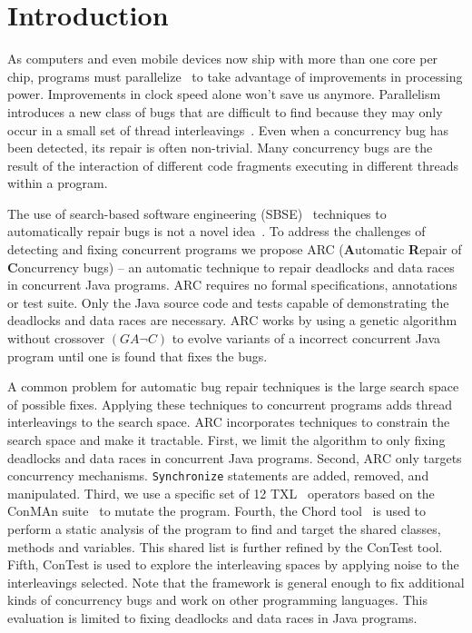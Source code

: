 \documentclass[runningheads,a4paper]{llncs}
\begin{document}
 \section{Introduction}
\label{sec:introduction}

As computers and even mobile devices now ship with more than one core per chip, programs must parallelize~\cite{SL05} to take advantage of improvements in processing power. Improvements in clock speed alone won't save us anymore. Parallelism introduces a new class of bugs that are difficult to find because they may only occur in a small set of thread interleavings~\cite{MQB07}. Even when a concurrency bug has been detected, its repair is often non-trivial. Many concurrency bugs are the result of the interaction of different code fragments executing in different threads within a program. 

The use of search-based software engineering (SBSE)~\cite{Har+10} techniques to automatically repair bugs is not a novel idea~\cite{FNWG09, WNLF09, NWLF09, WFGN10, GNFW11, LDFW12}. To address the challenges of detecting and fixing concurrent programs we propose ARC (\textbf{A}utomatic \textbf{R}epair of \textbf{C}oncurrency bugs) -- an automatic technique to repair deadlocks and data races in concurrent Java programs. ARC requires no formal specifications, annotations or test suite. Only the Java source code and tests capable of demonstrating the deadlocks and data races are necessary. ARC works by using a genetic algorithm without crossover $(GA \neg C)$ to evolve variants of a incorrect concurrent Java program until one is found that fixes the bugs.

A common problem for automatic bug repair techniques is the large search space of possible fixes. Applying these techniques to  concurrent programs adds thread interleavings to the search space. ARC incorporates techniques to constrain the search space and make it tractable. First, we limit the algorithm to only fixing deadlocks and data races in concurrent Java programs. Second, ARC only targets concurrency mechanisms. \texttt{Synchronize} statements are added, removed, and manipulated. Third, we use a specific set of 12 TXL~\cite{CHP91} operators based on the ConMAn suite~\cite{BCD06} to mutate the program.  Fourth, the Chord tool~\cite{NA07} is used to perform a static analysis of the program to find and target the shared classes, methods and variables. This shared list is further refined by the ConTest tool. Fifth, ConTest is used to explore the interleaving spaces by applying noise to the interleavings selected.  Note that the framework is general enough to fix additional kinds of concurrency bugs and work on other programming languages. This evaluation is limited to fixing deadlocks and data races in Java programs.
\end{document}
